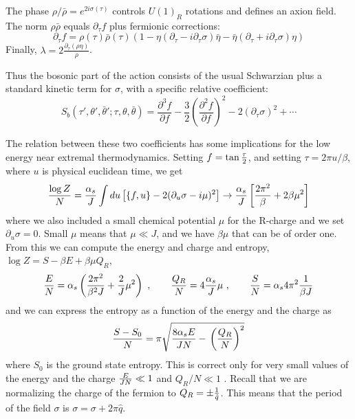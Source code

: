 \documentclass[aps,pre,preprint,onecolumn,citeautoscript,superscriptaddress,nofootinbib,eqsecnum]{revtex4-1}
\def\be{\begin{equation}}
\def\ee{\end{equation}}
\begin{document}
The phase $\rho/\bar \rho = e^{2 i \sigma(\tau)}$ controls $U(1)_R$ rotations and defines an axion field. The norm 
$\rho \bar \rho$ equals $\partial_\tau f$ plus fermionic corrections: 
\begin{equation}
\partial_\tau f =\rho(\tau) \bar \rho(\tau)\left(1-\eta (\partial_\tau - i \partial_\tau \sigma) \bar \eta - \bar \eta (\partial_\tau+ i \partial_\tau \sigma) \eta\right)  
\end{equation}
Finally, $\lambda = 2 \frac{\partial_\tau( \rho \eta)}{\rho}$. 

Thus the bosonic part of the action consists of the usual Schwarzian plus a standard kinetic term for $\sigma$, with a specific 
relative coefficient:
\begin{equation}
S_b(\tau', \theta', \bar \theta';\tau, \theta, \bar \theta) = \frac{\partial^3 f}{\partial f} - \frac32 \left(\frac{\partial^2 f}{\partial f}\right)^2
-2( \partial_\tau \sigma)^2 + \cdots \end{equation}

 The relation between these two coefficients has some implications for the low energy near
extremal thermodynamics. 
    Setting  $f = \tan { \tau \over 2 } $, and setting $\tau = 2 \pi u /\beta $, where $u $ is physical euclidean
time, we get 
    \be \label{TDTwo}
    { \log Z \over N }  = { \alpha_s \over J } \int du   \left[ \{ f, u \} - 2 (\partial_u\sigma - i \mu)^2 \right] 
\to  { \alpha_s \over  J } \left[ {   2 \pi ^2 \over \beta}   + 2  \beta \mu ^2 \right]
\ee
where we also included a small chemical potential $\mu$ for the R-charge and we set $\partial_u \sigma =0$.  Small $\mu $ means that 
$\mu \ll J$, and we have $\beta \mu$ that can be of order one.  
     From this we can compute the energy and charge and entropy,  $\log Z = S - \beta E + \beta \mu Q_R $,  
    \be
     { E \over N } = \alpha_s \left(  { 2 \pi^2 \over \beta^2 J } + { 2  \over J } \mu^2  \right) ~,~~~~~~
     { Q_R \over N } = 4 { \alpha_s  \over J }  \mu ~,~~~~~~{ S \over N } = \alpha_s 4 \pi^2 { 1 \over \beta J } 
     \ee
    and we can express the entropy as a function of the energy and the charge as 
    \be \label{EntrNTwo}
    { S-S_0 \over N } =   \pi   \sqrt{ { 8 \alpha_s E \over J N } - {  } \left( { Q_R \over N } \right)^2 } 
    \ee
    where $S_0$ is the ground state entropy. 
This is correct only for very small values of the energy and the charge $ { E \over J N } \ll 1$ and  $Q_R/N \ll 1$ . 
    Recall that we are normalizing the charge of the fermion to $Q_R = \pm { 1 \over \hat q } $. 
This means that the period of the field $\sigma$ is  $\sigma = \sigma + 2 \pi \hat q $.  
\end{document}
